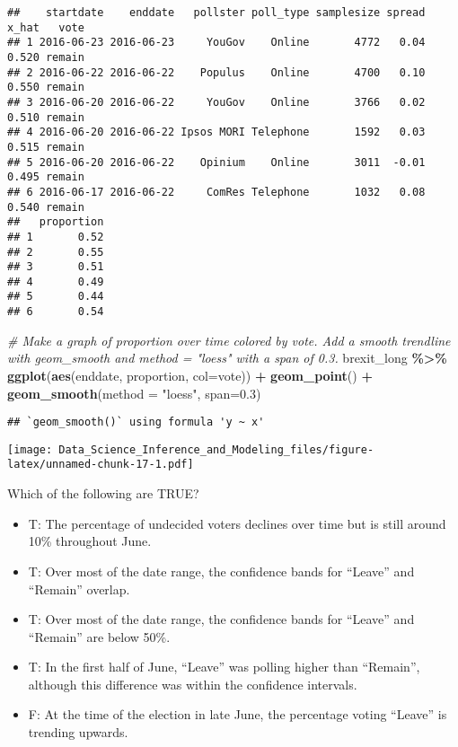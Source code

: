 \documentclass[
]{article}
\newenvironment{Shaded}{\begin{snugshade}}{\end{snugshade}}
\newcommand{\CommentTok}[1]{\textcolor[rgb]{0.56,0.35,0.01}{\textit{#1}}}
\newcommand{\DataTypeTok}[1]{\textcolor[rgb]{0.13,0.29,0.53}{#1}}
\newcommand{\FloatTok}[1]{\textcolor[rgb]{0.00,0.00,0.81}{#1}}
\newcommand{\KeywordTok}[1]{\textcolor[rgb]{0.13,0.29,0.53}{\textbf{#1}}}
\newcommand{\NormalTok}[1]{#1}
\newcommand{\OperatorTok}[1]{\textcolor[rgb]{0.81,0.36,0.00}{\textbf{#1}}}
\newcommand{\StringTok}[1]{\textcolor[rgb]{0.31,0.60,0.02}{#1}}
\providecommand{\tightlist}{%
  \setlength{\itemsep}{0pt}\setlength{\parskip}{0pt}}
\begin{document}
\begin{verbatim}
##    startdate    enddate   pollster poll_type samplesize spread x_hat   vote
## 1 2016-06-23 2016-06-23     YouGov    Online       4772   0.04 0.520 remain
## 2 2016-06-22 2016-06-22    Populus    Online       4700   0.10 0.550 remain
## 3 2016-06-20 2016-06-22     YouGov    Online       3766   0.02 0.510 remain
## 4 2016-06-20 2016-06-22 Ipsos MORI Telephone       1592   0.03 0.515 remain
## 5 2016-06-20 2016-06-22    Opinium    Online       3011  -0.01 0.495 remain
## 6 2016-06-17 2016-06-22     ComRes Telephone       1032   0.08 0.540 remain
##   proportion
## 1       0.52
## 2       0.55
## 3       0.51
## 4       0.49
## 5       0.44
## 6       0.54
\end{verbatim}

\begin{Shaded}
\begin{Highlighting}[]
\CommentTok{\# Make a graph of proportion over time colored by vote. Add a smooth trendline with geom\_smooth and method = "loess" with a span of 0.3.}
\NormalTok{brexit\_long }\OperatorTok{\%\textgreater{}\%}
\StringTok{  }\KeywordTok{ggplot}\NormalTok{(}\KeywordTok{aes}\NormalTok{(enddate, proportion, }\DataTypeTok{col=}\NormalTok{vote)) }\OperatorTok{+}
\StringTok{  }\KeywordTok{geom\_point}\NormalTok{() }\OperatorTok{+}
\StringTok{  }\KeywordTok{geom\_smooth}\NormalTok{(}\DataTypeTok{method =} \StringTok{"loess"}\NormalTok{, }\DataTypeTok{span=}\FloatTok{0.3}\NormalTok{)}
\end{Highlighting}
\end{Shaded}

\begin{verbatim}
## `geom_smooth()` using formula 'y ~ x'
\end{verbatim}

\texttt{[image: Data\_Science\_Inference\_and\_Modeling\_files/figure-latex/unnamed-chunk-17-1.pdf]}

Which of the following are TRUE?

\begin{itemize}
\tightlist
\item
  T: The percentage of undecided voters declines over time but is still
  around 10\% throughout June.
\item
  T: Over most of the date range, the confidence bands for ``Leave'' and
  ``Remain'' overlap.
\item
  T: Over most of the date range, the confidence bands for ``Leave'' and
  ``Remain'' are below 50\%.
\item
  T: In the first half of June, ``Leave'' was polling higher than
  ``Remain'', although this difference was within the confidence
  intervals.
\item
  F: At the time of the election in late June, the percentage voting
  ``Leave'' is trending upwards.
\end{itemize}
\end{document}
